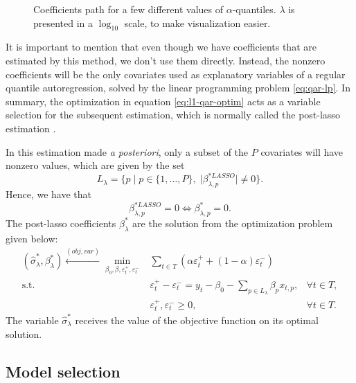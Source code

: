 \begin{figure}
\begin{minipage}[t]{0.4\linewidth}
\begin{minipage}[b]{\linewidth}
			\label{fig:npqar-cross}
		\end{minipage}
	\end{minipage}
	\caption{Coefficients path for a few different values of $\alpha$-quantiles. $\lambda$ is presented in a $\log_{10}$ scale, to make visualization easier.}
	\label{fig:npqar-results}
\end{figure}

It is important to mention that even though we have coefficients that are estimated by this method, we don't use them directly. Instead, the nonzero coefficients will be the only covariates used as explanatory variables of a regular quantile autoregression, solved by the linear programming problem \ref{eq:qar-lp}. In summary, the optimization in equation \ref{eq:l1-qar-optim} acts as a variable selection for the subsequent estimation, which is normally called the post-lasso estimation \cite{belloni2009least}.

In this estimation made \textit{a posteriori}, only a subset of the $P$ covariates will have nonzero values, which are given by the set 
\begin{equation*}
L_\lambda = \{ p \; | \; p \in \{ 1,\dots,P \}, \; |\beta^{*LASSO}_{\lambda,p}| \neq 0  \}.
\end{equation*}
Hence, we have that
$$\beta^{*LASSO}_{\lambda,p} = 0 \iff \beta^{*}_{\lambda,p} = 0.$$
The post-lasso coefficients $\beta_\lambda^*$ are the solution from the optimization problem given below:
\begin{equation}
\begin{aligned} (\hat{\sigma}_{\lambda}^{*},\beta_{\lambda}^{*})\overset{(obj,var)}{\longleftarrow} \min_{\beta_0,\beta,\varepsilon_{t}^{+},\varepsilon_{t}^{-}} & \sum_{t \in T}\left(\alpha\varepsilon_{t}^{+}+(1-\alpha)\varepsilon_{t}^{-}\right) \\
\mbox{s.t. } & \varepsilon_{t}^{+}-\varepsilon_{t}^{-}=y_{t} - \beta_0 - \sum_{p\in L_\lambda} \beta_p x_{t,p},& \forall t\in T,\\
& \varepsilon_t^+,\varepsilon_t^- \geq 0, & \forall t \in T.
\end{aligned}
\label{eq:post-lasso}
\end{equation}
The variable $\hat{\sigma}_{\lambda}^{*}$ receives the value of the objective function on its optimal solution.


\subsection{Model selection}

